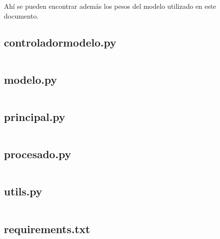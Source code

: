 \documentclass[./main.tex]{subfiles}
\begin{document}
Ahí se pueden encontrar además los pesos del modelo utilizado en este documento.

\subsection{controlador\textunderscore modelo.py}
\inputminted[fontsize=\footnotesize]{python}{./codigo/ampliador/controlador_modelo.py}
\subsection{modelo.py}
\inputminted[fontsize=\footnotesize]{python}{./codigo/ampliador/modelo.py}
\subsection{principal.py}
\inputminted[fontsize=\footnotesize]{python}{./codigo/ampliador/principal.py}
\subsection{procesado.py}
\inputminted[fontsize=\footnotesize]{python}{./codigo/ampliador/procesado.py}
\subsection{utils.py}
\inputminted[fontsize=\footnotesize]{python}{./codigo/ampliador/utils.py}
\subsection{requirements.txt}
\inputminted[fontsize=\footnotesize]{python}{./codigo/ampliador/requirements.txt}
\end{document}
